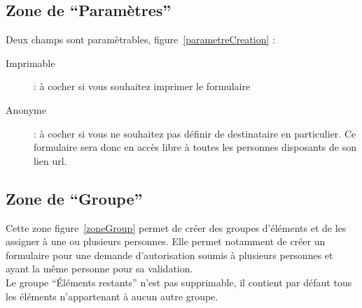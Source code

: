 \documentclass[a4paper,11pt,final]{report}
\begin{document}
\subsection{Zone de ``Paramètres''}
Deux champs sont paramètrables, figure~\ref{parametreCreation} :
\begin{description}
	\item [Imprimable] : à cocher si vous souhaitez imprimer le formulaire
	\item [Anonyme] : à cocher si vous ne souhaitez pas définir de destinataire en particulier. Ce formulaire sera donc en accès libre à toutes les personnes disposants de son lien url.
\end{description}

\noindent\begin{minipage}{\linewidth}%
\label{parametreCreation}
\end{minipage}

\subsection{Zone de ``Groupe''}
Cette zone figure~\ref{zoneGroup} permet de créer des groupes d'éléments et de les assigner à une ou plusieurs personnes. Elle permet notamment de créer un formulaire pour une demande d'autorisation soumis à plusieurs personnes et ayant la même personne pour sa validation.\\
Le groupe ``Éléments restants'' n'est pas supprimable, il contient par défaut tous les éléments n'appartenant à aucun autre groupe.\\

\noindent\begin{minipage}{\linewidth}%
\label{zoneGroup}
\end{minipage}
\end{document}
